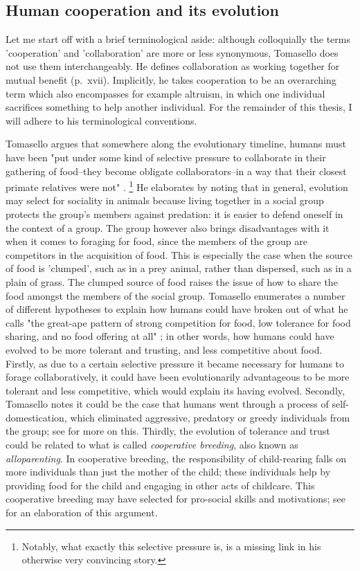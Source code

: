 \subsection{Human cooperation and its evolution}

Let me start off with a brief terminological aside: although colloquially the terms 'cooperation' and 'collaboration' are more or less synonymous, Tomasello does not use them interchangeably. He defines collaboration as working together for mutual benefit (p.~xvii). Implicitly, he takes cooperation to be an overarching term which also encompasses for example altruism, in which one individual sacrifices something to help another individual. For the remainder of this thesis, I will adhere to his terminological conventions.

Tomasello argues that somewhere along the evolutionary timeline, humans must have been "put under some kind of selective pressure to collaborate in their gathering of food--they become obligate collaborators--in a way that their closest primate relatives were not" \citep[p.~75]{Tomasello09}.
\footnote{Notably, what exactly this selective pressure is, is a missing link in his otherwise very convincing story.}
He elaborates by noting that in general, evolution may select for sociality in animals because living together in a social group protects the group's members against predation: it is easier to defend oneself in the context of a group. The group however also brings disadvantages with it when it comes to foraging for food, since the members of the group are competitors in the acquisition of food. This is especially the case when the source of food is 'clumped', such as in a prey animal, rather than dispersed, such as in a plain of grass. The clumped source of food raises the issue of how to share the food amongst the members of the social group.
Tomasello enumerates a number of different hypotheses to explain how humans could have broken out of what he calls "the great-ape pattern of strong competition for food, low tolerance for food sharing, and no food offering at all" \citep[p.~83]{Tomasello09}; in other words, how humans could have evolved to be more tolerant and trusting, and less competitive about food.
Firstly, as due to a certain selective pressure it became necessary for humans to forage collaboratively, it could have been evolutionarily advantageous to be more tolerant and less competitive, which would explain its having evolved.
Secondly, Tomasello notes it could be the case that humans went through a process of self-domestication, which eliminated aggressive, predatory or greedy individuals from the group; see \citet{Benitez21} for more on this.
Thirdly, the evolution of tolerance and trust could be related to what is called \emph{cooperative breeding}, also known as \emph{alloparenting}. In cooperative breeding, the responsibility of child-rearing falls on more individuals than just the mother of the child; these individuals help by providing food for the child and engaging in other acts of childcare. This cooperative breeding may have selected for pro-social skills and motivations; see \citet{Hrdy09} for an elaboration of this argument.

